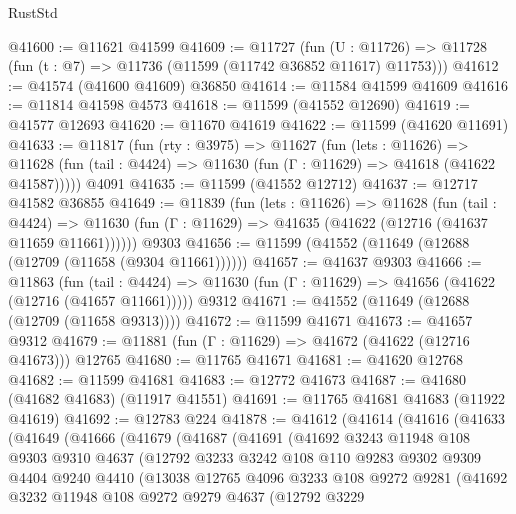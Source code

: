 \begin{lexlean}{RustStd}
\begin{coremodule}
@41600 := @11621 @41599
@41609 := @11727
    (fun (U : @11726) => @11728 (fun (t : @7) => @11736 (@11599 (@11742 @36852 @11617) @11753)))
@41612 := @41574 (@41600 @41609) @36850
@41614 := @11584 @41599 @41609
@41616 := @11814 @41598 @4573
@41618 := @11599 (@41552 @12690)
@41619 := @41577 @12693
@41620 := @11670 @41619
@41622 := @11599 (@41620 @11691)
@41633 := @11817
    (fun (rty : @3975) =>
    @11627
      (fun (lets : @11626) =>
      @11628 (fun (tail : @4424) => @11630 (fun (Γ : @11629) => @41618 (@41622 @41587)))))
    @4091
@41635 := @11599 (@41552 @12712)
@41637 := @12717 @41582 @36855
@41649 := @11839
    (fun (lets : @11626) =>
    @11628
      (fun (tail : @4424) =>
      @11630 (fun (Γ : @11629) => @41635 (@41622 (@12716 (@41637 @11659 @11661))))))
    @9303
@41656 := @11599 (@41552 (@11649 (@12688 (@12709 (@11658 (@9304 @11661))))))
@41657 := @41637 @9303
@41666 := @11863
    (fun (tail : @4424) => @11630 (fun (Γ : @11629) => @41656 (@41622 (@12716 (@41657 @11661)))))
    @9312
@41671 := @41552 (@11649 (@12688 (@12709 (@11658 @9313))))
@41672 := @11599 @41671
@41673 := @41657 @9312
@41679 := @11881 (fun (Γ : @11629) => @41672 (@41622 (@12716 @41673))) @12765
@41680 := @11765 @41671
@41681 := @41620 @12768
@41682 := @11599 @41681
@41683 := @12772 @41673
@41687 := @41680 (@41682 @41683) (@11917 @41551)
@41691 := @11765 @41681 @41683 (@11922 @41619)
@41692 := @12783 @224
@41878 := @41612
    (@41614
      (@41616
        (@41633
          (@41649
            (@41666
              (@41679
                (@41687
                  (@41691
                    (@41692
                      @3243
                      @11948
                      @108
                      @9303
                      @9310
                      @4637
                      (@12792
                        @3233
                        @3242
                        @108
                        @110
                        @9283
                        @9302
                        @9309
                        @4404
                        @9240
                        @4410
                        (@13038
                          @12765
                          @4096
                          @3233
                          @108
                          @9272
                          @9281
                          (@41692
                            @3232
                            @11948
                            @108
                            @9272
                            @9279
                            @4637
                            (@12792
                              @3229

\end{coremodule}
\end{lexlean}
